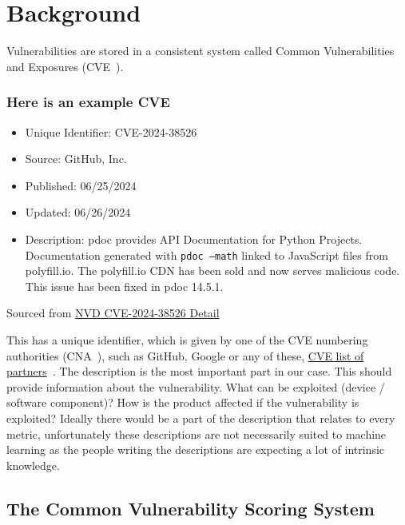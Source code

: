 \documentclass[12pt]{article}
\begin{document}
\section{Background}

Vulnerabilities are stored in a consistent system called Common Vulnerabilities and
Exposures (CVE~\cite{CVE}).

\subsubsection*{Here is an example CVE}
\begin{itemize}

	\item   Unique Identifier: CVE-2024-38526

	\item   Source: GitHub, Inc.

	\item   Published: 06/25/2024

	\item   Updated: 06/26/2024

	\item   Description: pdoc provides API Documentation for Python Projects. Documentation
	      generated with \texttt{pdoc --math} linked to JavaScript files from polyfill.io. The polyfill.io
	      CDN has been sold and now serves malicious code. This issue has been fixed in pdoc 14.5.1.

\end{itemize}

{\footnotesize Sourced from \href{https://nvd.nist.gov/vuln/detail/CVE-2024-38526}{NVD CVE-2024-38526
	Detail} \cite{polyfill}} \\
\bigskip

This has a unique identifier, which is given by one of the CVE numbering authorities (CNA~\cite{CNA}), such as
GitHub, Google or any of these, \href{https://www.cve.org/PartnerInformation/ListofPartners}{CVE list of
	partners}~\cite{partners}.
The description is the most important part in our case. This should provide information about the
vulnerability. What can be exploited (device / software component)? How is the product affected if
the vulnerability is exploited? Ideally there would be a part of the description that relates to every metric,
unfortunately these descriptions are not necessarily suited to machine learning as the people
writing the descriptions are expecting a lot of intrinsic knowledge.

\subsection*{The Common Vulnerability Scoring System}
\end{document}
